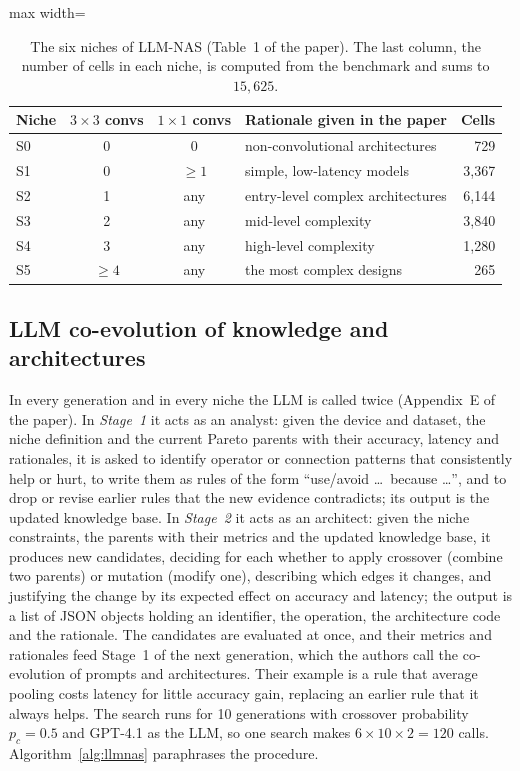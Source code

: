 \documentclass[preprint,12pt,authoryear]{elsarticle}
\begin{document}
\begin{table}[h]\centering\small
\caption{The six niches of LLM-NAS (Table~1 of the paper). The last column, the number of cells in each niche, is computed from the benchmark and sums to $15{,}625$.}\label{tab:niches}
\begin{adjustbox}{max width=\linewidth}
\begin{tabular}{lccp{5.6cm}r}
\toprule
Niche & $3{\times}3$ convs & $1{\times}1$ convs & Rationale given in the paper & Cells \\
\midrule
S0 & 0 & 0 & non-convolutional architectures & 729 \\
S1 & 0 & $\ge1$ & simple, low-latency models & 3{,}367 \\
S2 & 1 & any & entry-level complex architectures & 6{,}144 \\
S3 & 2 & any & mid-level complexity & 3{,}840 \\
S4 & 3 & any & high-level complexity & 1{,}280 \\
S5 & $\ge4$ & any & the most complex designs & 265 \\
\bottomrule
\end{tabular}
\end{adjustbox}
\end{table}

\subsection{LLM co-evolution of knowledge and architectures}
In every generation and in every niche the LLM is called twice (Appendix~E of the paper). In \emph{Stage~1} it acts as an analyst: given the device and dataset, the niche definition and the current Pareto parents with their accuracy, latency and rationales, it is asked to identify operator or connection patterns that consistently help or hurt, to write them as rules of the form ``use/avoid \ldots\ because \ldots'', and to drop or revise earlier rules that the new evidence contradicts; its output is the updated knowledge base. In \emph{Stage~2} it acts as an architect: given the niche constraints, the parents with their metrics and the updated knowledge base, it produces new candidates, deciding for each whether to apply crossover (combine two parents) or mutation (modify one), describing which edges it changes, and justifying the change by its expected effect on accuracy and latency; the output is a list of JSON objects holding an identifier, the operation, the architecture code and the rationale. The candidates are evaluated at once, and their metrics and rationales feed Stage~1 of the next generation, which the authors call the co-evolution of prompts and architectures. Their example is a rule that average pooling costs latency for little accuracy gain, replacing an earlier rule that it always helps. The search runs for 10 generations with crossover probability $p_c=0.5$ and GPT-4.1 as the LLM, so one search makes $6\times10\times2=120$ calls. Algorithm~\ref{alg:llmnas} paraphrases the procedure.
\end{document}
